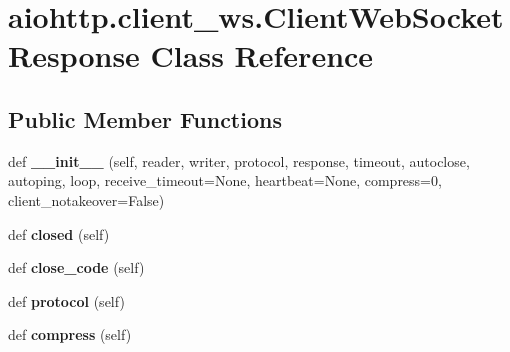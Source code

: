 \hypertarget{classaiohttp_1_1client__ws_1_1_client_web_socket_response}{}\section{aiohttp.\+client\+\_\+ws.\+Client\+Web\+Socket\+Response Class Reference}
\label{classaiohttp_1_1client__ws_1_1_client_web_socket_response}
\subsection*{Public Member Functions}
\begin{DoxyCompactItemize}
\item 
\mbox{\label{classaiohttp_1_1client__ws_1_1_client_web_socket_response_a548908749476340ea0977df7d99fd510}} 
def {\bfseries \+\_\+\+\_\+init\+\_\+\+\_\+} (self, reader, writer, protocol, response, timeout, autoclose, autoping, loop, receive\+\_\+timeout=None, heartbeat=None, compress=0, client\+\_\+notakeover=False)
\item 
\mbox{\label{classaiohttp_1_1client__ws_1_1_client_web_socket_response_a0ac0863a379d8e2325516656076e8290}} 
def {\bfseries closed} (self)
\item 
\mbox{\label{classaiohttp_1_1client__ws_1_1_client_web_socket_response_a6ece4f3cec05cf7baff12d5258ba8263}} 
def {\bfseries close\+\_\+code} (self)
\item 
\mbox{\label{classaiohttp_1_1client__ws_1_1_client_web_socket_response_a92c5642c4a9f2dc5882c3bfff5da72f6}} 
def {\bfseries protocol} (self)
\item 
\mbox{\label{classaiohttp_1_1client__ws_1_1_client_web_socket_response_a327dd98f56764735411bc87ae62d4e09}} 
def {\bfseries compress} (self)
\item 
\mbox{\label{classaiohttp_1_1client__ws_1_1_client_web_socket_response_aa03495f95c772753071b7b1dac48f49d}} 

\end{DoxyCompactItemize}
